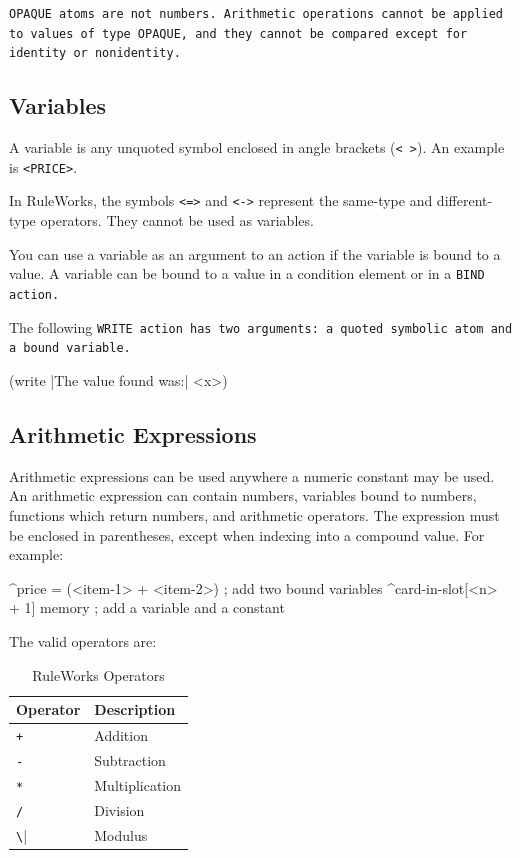 \begin{note}
  \tt{OPAQUE} atoms are not numbers. Arithmetic operations cannot be
  applied to values of type \tt{OPAQUE}, and they cannot be compared
  except for identity or nonidentity.
\end{note}

\subsection{Variables}

A variable is any unquoted symbol enclosed in angle brackets
(\verb|< >|). An example is \verb|<PRICE>|.

\begin{note}
  In RuleWorks, the symbols \verb|<=>| and \verb|<->| represent the
  same-type and different-type operators. They cannot be used as
  variables.
\end{note}

You can use a variable as an argument to an action if the variable is
bound to a value. A variable can be bound to a value in a condition
element or in a \tt{BIND} action.

The following \tt{WRITE} action has two arguments: a quoted symbolic
atom and a bound variable.
\begin{qv}
(write |The value found was:| <x>)
\end{qv}

\subsection{Arithmetic Expressions}

Arithmetic expressions can be used anywhere a numeric constant may be
used. An arithmetic expression can contain numbers, variables bound to
numbers, functions which return numbers, and arithmetic operators. The
expression must be enclosed in parentheses, except when indexing into
a compound value. For example:
\begin{qv}
^price = (<item-1> + <item-2>) ; add two bound variables
^card-in-slot[<n> + 1] memory ; add a variable and a constant
\end{qv}
The valid operators are:
\begin{table}[h]
  \centering
  \begin{tabular}{ll}
    \toprule
 Operator & Description    \\
    \midrule
    \verb|+|        & Addition       \\
    \verb|-|        & Subtraction    \\
    \verb|*|        & Multiplication \\
    \verb|/|        & Division       \\
    \verb|\|        & Modulus        \\
    \bottomrule
  \end{tabular}
  \caption{RuleWorks Operators}
\end{table}

